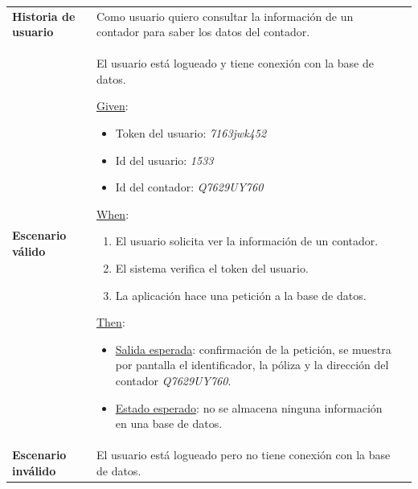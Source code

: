 \documentclass[pdftex,11pt,a4paper]{book}
\begin{document}
\begin{center}
\begin{longtable}{|>{\centering\arraybackslash}X m{2cm}|m{12cm}|}
\hline
\multicolumn{2}{|c|}{\textbf{Prueba de aceptación PA03}}\\
\hline 
\endhead

\textbf{Historia de usuario} & Como usuario quiero consultar la información de un contador para saber los datos del contador.

\\ \hline

\textbf{Escenario válido} & {\raggedright El usuario está logueado y tiene conexión con la base de datos.\par}
\vspace{2mm}
\break

\underline{Given}:
\begin{itemize}
\addtolength{\itemsep}{-3mm}
\item Token del usuario: \textit{7163jwk452}
\item Id del usuario: \textit{1533}
\item Id del contador: \textit{Q7629UY760}
\end{itemize}
\vspace{3mm}

\underline{When}:
\begin{enumerate}
\vspace{-3mm}
\addtolength{\itemsep}{-3mm}
\item El usuario solicita ver la información de un contador.
\item El sistema verifica el token del usuario.
\item La aplicación hace una petición a la base de datos.
\end{enumerate}
\break

\underline{Then}:
\vspace{-3mm}
\begin{itemize}
\addtolength{\itemsep}{-3mm}
\item \underline{Salida esperada}: confirmación de la petición, se muestra por pantalla el identificador, la póliza y la dirección del contador \textit{Q7629UY760}.
\item \underline{Estado esperado}: no se almacena ninguna información en una base de datos.
\end{itemize}

\\ \hline
\textbf{Escenario inválido} & {\raggedright El usuario está logueado pero no tiene conexión con la base de datos.\par}
\vspace{2mm}
\break


\end{longtable}
\end{center}
\end{document}
